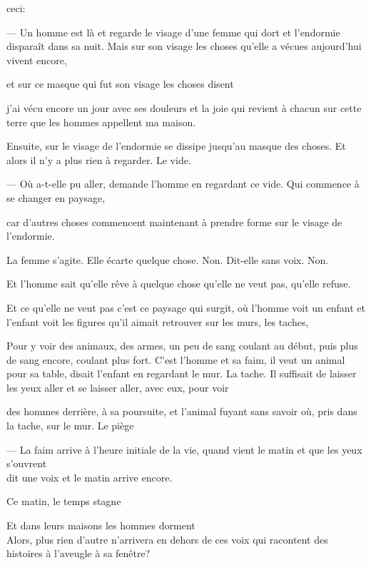 ceci:

--- Un homme est là et regarde le visage d'une femme qui dort et
l'endormie disparaît dans sa nuit. Mais sur son visage les choses
qu'elle a vécues aujourd'hui vivent encore,

et sur ce masque qui fut son visage les choses disent

j'ai vécu encore un jour avec ses douleurs et la joie qui revient à
chacun sur cette terre que les hommes appellent ma maison.

Ensuite, sur le visage de l'endormie se dissipe jusqu'au masque des
choses. Et alors il n'y a plus rien à regarder. Le vide.

--- Où a-t-elle pu aller, demande l'homme en regardant ce vide. Qui
commence à se changer en paysage,

car d'autres choses commencent maintenant à prendre forme sur le visage
de l'endormie.

La femme s'agite. Elle écarte quelque chose. Non. Dit-elle sans voix.
Non.

Et l'homme sait qu'elle rêve à quelque chose qu'elle ne veut pas,
qu'elle refuse.

Et ce qu'elle ne veut pas c'est ce paysage qui surgit, où l'homme voit
un enfant et l'enfant voit les figures qu'il aimait retrouver sur les
murs, les taches,

Pour y voir des animaux, des armes, un peu de sang coulant au début,
puis plus de sang encore, coulant plus fort. C'est l'homme et sa faim,
il veut un animal pour sa table, disait l'enfant en regardant le mur. La
tache. Il suffisait de laisser les yeux aller et se laisser aller, avec
eux, pour voir

des hommes derrière, à sa poursuite, et l'animal fuyant sans savoir où,
pris dans la tache, sur le mur. Le piège

\breakk

\vspace*{4cm}

--- La faim arrive à l'heure initiale de la vie, quand vient le matin et
que les yeux s'ouvrent\\

dit une voix et le matin arrive encore.

Ce matin, le temps stagne

Et dans leurs maisons les hommes dorment\\

Alors, plus rien d'autre n'arrivera en dehors de ces voix qui racontent
des histoires à l'aveugle à sa fenêtre?

